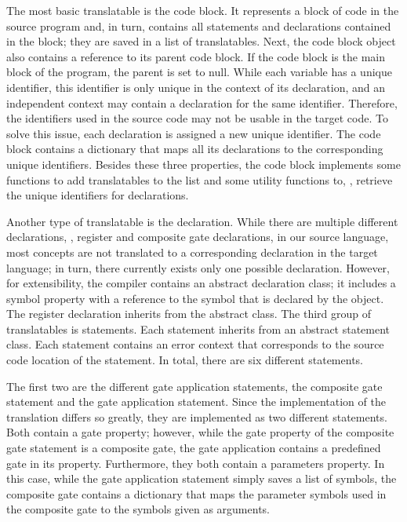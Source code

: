 The most basic translatable is the code block. It represents a block of code in the source program and, in turn, contains all statements and declarations contained in the block; they are saved in a list of translatables. Next, the code block object also contains a reference to its parent code block. If the code block is the main block of the program, the parent is set to null. While each variable has a unique identifier, this identifier is only unique in the context of its declaration, and an independent context may contain a declaration for the same identifier. Therefore, the identifiers used in the source code may not be usable in the target code. To solve this issue, each declaration is assigned a new unique identifier. The code block contains a dictionary that maps all its declarations to the corresponding unique identifiers. Besides these three properties, the code block implements some functions to add translatables to the list and some utility functions to, \eg, retrieve the unique identifiers for declarations.

Another type of translatable is the declaration. While there are multiple different declarations, \eg, register and composite gate declarations, in our source language, most concepts are not translated to a corresponding declaration in the target language; in turn, there currently exists only one possible declaration. However, for extensibility, the compiler contains an abstract declaration class; it includes a symbol property with a reference to the symbol that is declared by the object. The register declaration inherits from the abstract class.
The third group of translatables is statements. Each statement inherits from an abstract statement class. Each statement contains an error context that corresponds to the source code location of the statement. In total, there are six different statements. 

The first two are the different gate application statements, the composite gate statement and the gate application statement. Since the implementation of the translation differs so greatly, they are implemented as two different statements. Both contain a gate property; however, while the gate property of the composite gate statement is a composite gate, the gate application contains a predefined gate in its property. Furthermore, they both contain a parameters property. In this case, while the gate application statement simply saves a list of symbols, the composite gate contains a dictionary that maps the parameter symbols used in the composite gate to the symbols given as arguments.

